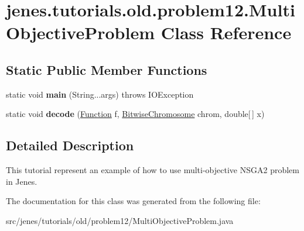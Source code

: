 \hypertarget{classjenes_1_1tutorials_1_1old_1_1problem12_1_1_multi_objective_problem}{
\section{jenes.tutorials.old.problem12.MultiObjectiveProblem Class Reference}
\label{classjenes_1_1tutorials_1_1old_1_1problem12_1_1_multi_objective_problem}
}
\subsection*{Static Public Member Functions}
\begin{CompactItemize}
\item 
\hypertarget{classjenes_1_1tutorials_1_1old_1_1problem12_1_1_multi_objective_problem_a56b8e189215e753714d1ed16fdf1075}{
static void \textbf{main} (String...args)  throws IOException }
\label{classjenes_1_1tutorials_1_1old_1_1problem12_1_1_multi_objective_problem_a56b8e189215e753714d1ed16fdf1075}

\item 
\hypertarget{classjenes_1_1tutorials_1_1old_1_1problem12_1_1_multi_objective_problem_793287d33c3ae22a258312881dbed2a3}{
static void \textbf{decode} (\hyperlink{classjenes_1_1tutorials_1_1old_1_1problem12_1_1_function}{Function} f, \hyperlink{classjenes_1_1chromosome_1_1_bitwise_chromosome}{BitwiseChromosome} chrom, double\mbox{[}$\,$\mbox{]} x)}
\label{classjenes_1_1tutorials_1_1old_1_1problem12_1_1_multi_objective_problem_793287d33c3ae22a258312881dbed2a3}

\end{CompactItemize}


\subsection{Detailed Description}
This tutorial represent an example of how to use multi-objective NSGA2 problem in Jenes. 

The documentation for this class was generated from the following file:\begin{CompactItemize}
\item 
src/jenes/tutorials/old/problem12/MultiObjectiveProblem.java\end{CompactItemize}

